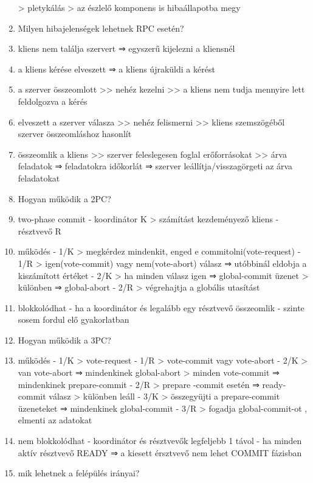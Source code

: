 \documentclass[twoside, a4paper, 12pt]{article}
\begin{document}
\begin{enumerate}
        > pletykálás
        > az észlelő komponens is hibaállapotba megy
    \item  Milyen hibajelenségek lehetnek RPC esetén?
    \item  kliens nem találja  szervert
        ⇒ egyszerű kijelezni a kliensnél
    \item a kliens kérése elveszett
        ⇒ a kliens újraküldi a kérést
    \item a szerver összeomlott
        >> nehéz kezelni >> a kliens nem tudja mennyire lett feldolgozva a kérés
    \item elveszett a szerver válasza
        >> nehéz felismerni >> kliens szemszögéből szerver összeomláshoz hasonlít
    \item összeomlik a kliens
        >> szerver feleslegesen foglal erőforrásokat >> árva feladatok
        ⇒ feladatokra időkorlát
        ⇒ szerver leállítja/visszagörgeti az árva feladatokat
    \item  Hogyan működik a 2PC?
    \item two-phase commit
        - koordinátor K 
        > számítást kezdeményező kliens
        - résztvevő R
    \item működés
        - 1/K
        > megkérdez mindenkit, enged e commitolni(vote-request)
        - 1/R
        > igen(vote-commit) vagy nem(vote-abort) válasz ⇒ utóbbinál eldobja a kiszámított értéket
        - 2/K
        > ha minden válasz igen ⇒ global-commit üzenet
        > különben ⇒ global-abort
        - 2/R
        > végrehajtja a globális utasítást
    \item blokkolódhat
        - ha a koordinátor és legalább egy résztvevő összeomlik
        - szinte sosem fordul elő gyakorlatban
    \item  Hogyan működik a 3PC?
    \item működés
        - 1/K
        > vote-request
        - 1/R
        > vote-commit vagy vote-abort
        - 2/K
        > van vote-abort ⇒ mindenkinek global-abort 
        > minden vote-commit ⇒ mindenkinek prepare-commit
        - 2/R
        > prepare -commit esetén ⇒ ready-commit válasz
        > különben leáll 
        - 3/K
        > összegyüjti a prepare-commit üzeneteket ⇒ mindenkinek global-commit
        - 3/R
        > fogadja global-commit-ot , elmenti az adatokat
    \item nem blokkolódhat
        - koordinátor és résztvevők legfeljebb 1 távol
        - ha minden aktív résztvevő READY ⇒ a kiesett érsztvevő nem lehet COMMIT fázisban
    \item  mik lehetnek a felépülés irányai?

\end{enumerate}
\end{document}
